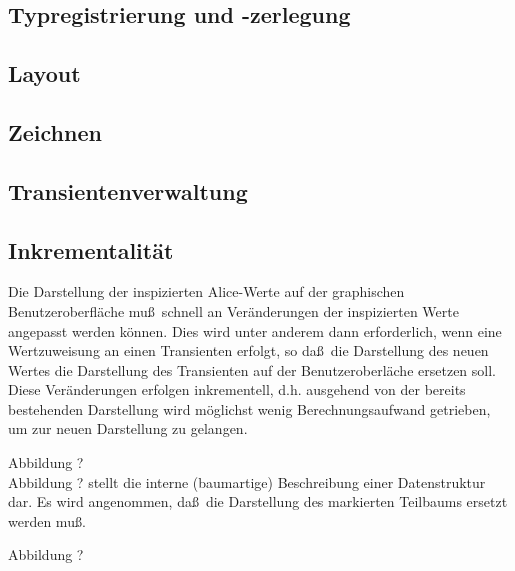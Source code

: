 \documentclass[12pt,a4paper]{article}
\begin{document}
\subsection{Typregistrierung und -zerlegung}

\subsection{Layout}

\subsection{Zeichnen}

\subsection{Transientenverwaltung}

\subsection{Inkrementalit\"at}

Die Darstellung der inspizierten Alice-Werte auf 
der graphischen Benutzeroberfl\"ache mu\ss \, 
schnell an Ver\"anderungen der inspizierten 
Werte angepasst werden k\"onnen. Dies 
wird unter anderem dann erforderlich, wenn 
eine Wertzuweisung an einen Transienten 
erfolgt, so da\ss \, die Darstellung des 
neuen Wertes die Darstellung des Transienten 
auf der Benutzeroberl\"ache ersetzen soll. 
Diese Ver\"anderungen erfolgen inkrementell, 
d.h. ausgehend von der bereits bestehenden 
Darstellung wird m\"oglichst wenig Berechnungsaufwand 
getrieben, um zur neuen Darstellung zu gelangen.

\begin{center}
\newline
\end{center}
Abbildung ? \\[1cm]


Abbildung ? stellt die interne 
(baumartige) Beschreibung einer Datenstruktur 
dar. Es wird angenommen, da\ss \, die Darstellung 
des markierten Teilbaums ersetzt werden mu\ss .

\begin{center}
\newline
\end{center}
Abbildung ? \\[1cm]
\end{document}
